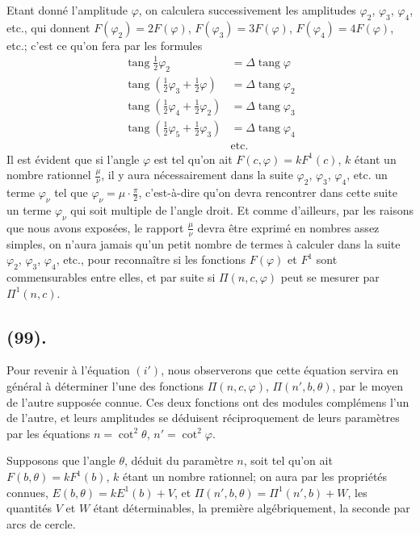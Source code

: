 \documentclass{article}
\begin{document}
Etant donné l'amplitude $\varphi$, on calculera successivement les amplitudes $\varphi_{2}$, $\varphi_{3}$, $\varphi_{4}$, etc., qui donnent $F(\varphi_{2})=2F(\varphi)$, $F(\varphi_{3})=3F(\varphi)$, $F(\varphi_{4})=4F(\varphi)$, etc.; c'est ce qu'on fera par les formules
\[ \begin{aligned} \operatorname{tang}\tfrac{1}{2}\varphi_{2}&=\Delta\operatorname{tang}\varphi\\ \operatorname{tang}(\tfrac{1}{2}\varphi_{3}+\tfrac{1}{2}\varphi)&=\Delta\operatorname{tang}\varphi_{2}\\ \operatorname{tang}(\tfrac{1}{2}\varphi_{4}+\tfrac{1}{2}\varphi_{2})&=\Delta\operatorname{tang}\varphi_{3}\\ \operatorname{tang}(\tfrac{1}{2}\varphi_{5}+\tfrac{1}{2}\varphi_{3})&=\Delta\operatorname{tang}\varphi_{4}\\ &\text{etc.} \end{aligned} \]
Il est évident que si l'angle $\varphi$ est tel qu'on ait $F(c,\varphi)=kF^{1}(c)$, $k$ étant un nombre rationnel $\frac{\mu}{\nu}$, il y aura nécessairement dans la suite $\varphi_{2}$, $\varphi_{3}$, $\varphi_{4}$, etc. un terme $\varphi_{\nu}$ tel que $\varphi_{\nu}=\mu\cdot\frac{\pi}{2}$, c'est-à-dire qu'on devra rencontrer dans cette suite un terme $\varphi_{\nu}$ qui soit multiple de l'angle droit. Et comme d'ailleurs, par les raisons que nous avons exposées, le rapport $\frac{\mu}{\nu}$ devra être exprimé en nombres assez simples, on n'aura jamais qu'un petit nombre de termes à calculer dans la suite $\varphi_{2}$, $\varphi_{3}$, $\varphi_{4}$, etc., pour reconnaître si les fonctions $F(\varphi)$ et $F^{1}$ sont commensurables entre elles, et par suite si $\Pi(n,c,\varphi)$ peut se mesurer par $\Pi^{1}(n,c)$.

\subsection*{(99).}

Pour revenir à l'équation $(i')$, nous observerons que cette équation servira en général à déterminer l'une des fonctions $\Pi(n,c,\varphi)$, $\Pi(n',b,\theta)$, par le moyen de l'autre supposée connue. Ces deux fonctions ont des modules complémens l'un de l'autre, et leurs amplitudes se déduisent réciproquement de leurs paramètres par les équations $n=\cot^{2}\theta$, $n'=\cot^{2}\varphi$.

Supposons que l'angle $\theta$, déduit du paramètre $n$, soit tel qu'on ait $F(b,\theta)=kF^{1}(b)$, $k$ étant un nombre rationnel; on aura par les propriétés connues, $E(b,\theta)=kE^{1}(b)+V$, et $\Pi(n',b,\theta)=\Pi^{1}(n',b)+W$, les quantités $V$ et $W$ étant déterminables, la première algébriquement, la seconde par arcs de cercle.
\end{document}
